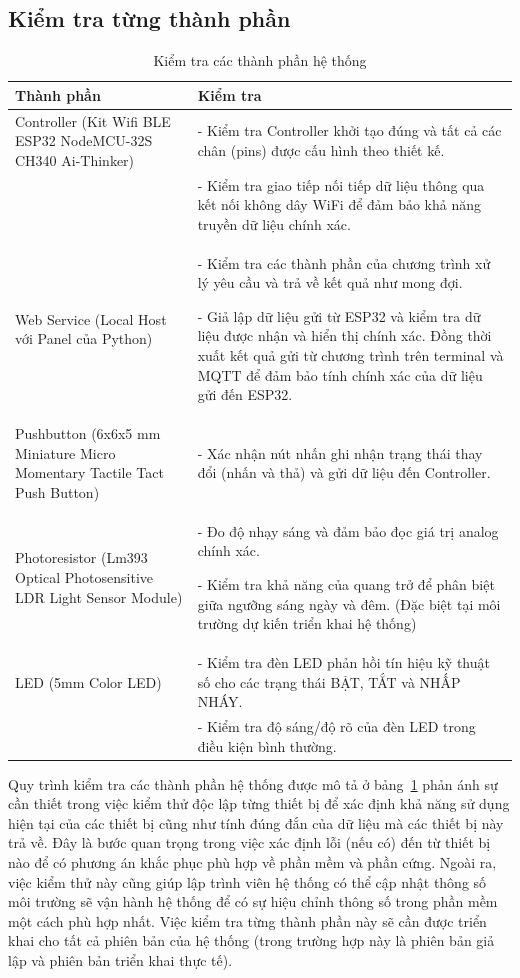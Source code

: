 {\subsection{Kiểm tra từng thành phần}
\begin{table}[h!]
\centering
\small
\begin{tabular}{|p{4cm}|p{10cm}|}
\hline
\textbf{Thành phần} & \textbf{Kiểm tra} \\ \hline
Controller (Kit Wifi BLE ESP32 NodeMCU-32S CH340 Ai-Thinker) & - Kiểm tra Controller khởi tạo đúng và tất cả các chân (pins) được cấu hình theo thiết kế. \\
& - Kiểm tra giao tiếp nối tiếp dữ liệu thông qua kết nối không dây WiFi để đảm bảo khả năng truyền dữ liệu chính xác. \\ \hline
Web Service (Local Host với Panel của Python) & - Kiểm tra các thành phần của chương trình xử lý yêu cầu và trả về kết quả như mong đợi.


- Giả lập dữ liệu gửi từ ESP32 và kiểm tra dữ liệu được nhận và hiển thị chính xác. Đồng thời xuất kết quả gửi từ chương trình trên terminal và MQTT để đảm bảo tính chính xác của dữ liệu gửi đến ESP32. \\ \hline
Pushbutton (6x6x5 mm Miniature Micro Momentary Tactile Tact Push Button) & - Xác nhận nút nhấn ghi nhận trạng thái thay đổi (nhấn và thả) và gửi dữ liệu đến Controller. \\ \hline
Photoresistor (Lm393 Optical Photosensitive LDR Light Sensor Module) & - Đo độ nhạy sáng và đảm bảo đọc giá trị analog chính xác. 


- Kiểm tra khả năng của quang trở để phân biệt giữa ngưỡng sáng ngày và đêm. (Đặc biệt tại môi trường dự kiến triển khai hệ thống) \\ \hline
LED (5mm Color LED) & - Kiểm tra đèn LED phản hồi tín hiệu kỹ thuật số cho các trạng thái BẬT, TẮT và NHẤP NHÁY. \\
& - Kiểm tra độ sáng/độ rõ của đèn LED trong điều kiện bình thường. \\ \hline
\end{tabular}
\caption{Kiểm tra các thành phần hệ thống}
\label{tab:component_checks}
\end{table}

Quy trình kiểm tra các thành phần hệ thống được mô tả ở bảng~\ref{tab:component_checks} phản ánh sự cần thiết trong việc kiểm thử độc lập từng thiết bị để xác định khả năng sử dụng hiện tại của các thiết bị cũng như tính đúng đắn của dữ liệu mà các thiết bị này trả về. Đây là bước quan trọng trong việc xác định lỗi (nếu có) đến từ thiết bị nào để có phương án khắc phục phù hợp về phần mềm và phần cứng. Ngoài ra, việc kiểm thử này cũng giúp lập trình viên hệ thống có thể cập nhật thông số môi trường sẽ vận hành hệ thống để có sự hiệu chỉnh thông số trong phần mềm một cách phù hợp nhất. Việc kiểm tra từng thành phần này sẽ cần được triển khai cho tất cả phiên bản của hệ thống (trong trường hợp này là phiên bản giả lập và phiên bản triển khai thực tế).   


}
